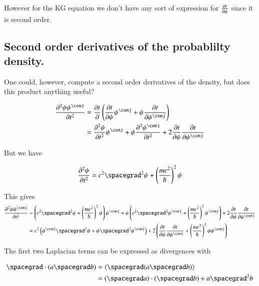 \documentclass{article}
\newcommand{\PDSq}[2]{\frac{\partial^2 {#2}}{\partial {#1}^2}}
\begin{document}
However for the KG equation we don't have any sort of expression for $\frac{\partial{t}}{\partial {\psi}}$ since it is second order.

\subsection{ Second order derivatives of the probablilty density. }

One could, however, compute a second order derivatives of the density, but does this product anything useful?

\begin{align*}
\PDSq{t}{\psi\psi^\conj} 
&= \PD{t}{}\left( \PD{t}{\psi}\psi^\conj + \psi \PD{t}{\psi^\conj} \right) \\
&= 
\PDSq{t}{\psi}\psi^\conj 
+ \psi \PDSq{t}{\psi^\conj} 
+ 2 \PD{t}{\psi}\PD{t}{\psi^\conj} 
\\
\end{align*}

But we have 

\begin{align*}
\PDSq{t}{\psi} = c^2 \spacegrad^2 \psi + \left(\frac{m c^2}{\hbar} \right)^2 \psi
\end{align*}

This gives
\begin{align*}
\PDSq{t}{\psi\psi^\conj} 
&= 
\left( c^2 \spacegrad^2 \psi + \left(\frac{m c^2}{\hbar} \right)^2 \psi \right) \psi^\conj 
+ \psi \left( c^2 \spacegrad^2 \psi^\conj + \left(\frac{m c^2}{\hbar} \right)^2 \psi^\conj \right)
+ 2 \PD{t}{\psi}\PD{t}{\psi^\conj} 
\\
&= 
c^2 \left( \psi^\conj \spacegrad^2 \psi + \psi \spacegrad^2 \psi^\conj \right)
+ 2 \left( 
\PD{t}{\psi}\PD{t}{\psi^\conj} + \left( \frac{m c^2}{\hbar} \right)^2 \psi \psi^\conj 
\right)
\\
\end{align*}

The first two Laplacian terms can be expressed as divergences with

\begin{align*}
\spacegrad \cdot (a \spacegrad b) 
&= 
\gpgradezero{ \spacegrad (a \spacegrad b) } \\
&= 
(\spacegrad a) \cdot (\spacegrad b) + a \spacegrad^2 b
\end{align*}
\end{document}
